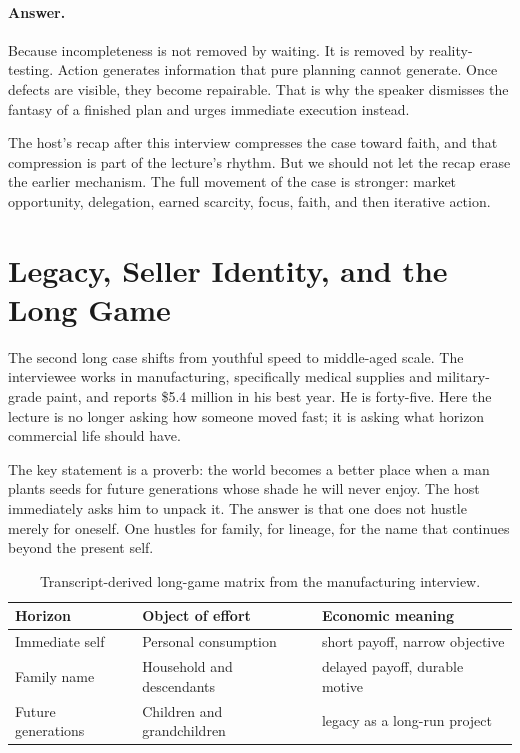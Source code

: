 \paragraph{Answer.} Because incompleteness is not removed by waiting. It is removed by reality-testing. Action generates information that pure planning cannot generate. Once defects are visible, they become repairable. That is why the speaker dismisses the fantasy of a finished plan and urges immediate execution instead.

The host's recap after this interview compresses the case toward faith, and that compression is part of the lecture's rhythm. But we should not let the recap erase the earlier mechanism. The full movement of the case is stronger: market opportunity, delegation, earned scarcity, focus, faith, and then iterative action.

\section{Legacy, Seller Identity, and the Long Game}

The second long case shifts from youthful speed to middle-aged scale. The interviewee works in manufacturing, specifically medical supplies and military-grade paint, and reports \$5.4 million in his best year. He is forty-five. Here the lecture is no longer asking how someone moved fast; it is asking what horizon commercial life should have.

The key statement is a proverb: the world becomes a better place when a man plants seeds for future generations whose shade he will never enjoy. The host immediately asks him to unpack it. The answer is that one does not hustle merely for oneself. One hustles for family, for lineage, for the name that continues beyond the present self.

\begin{table}[h]
\centering
\begin{tabular}{|l|l|l|}
\hline
Horizon & Object of effort & Economic meaning \\
\hline
Immediate self & Personal consumption & short payoff, narrow objective \\
Family name & Household and descendants & delayed payoff, durable motive \\
Future generations & Children and grandchildren & legacy as a long-run project \\
\hline
\end{tabular}
\caption{Transcript-derived long-game matrix from the manufacturing interview.}
\end{table}


